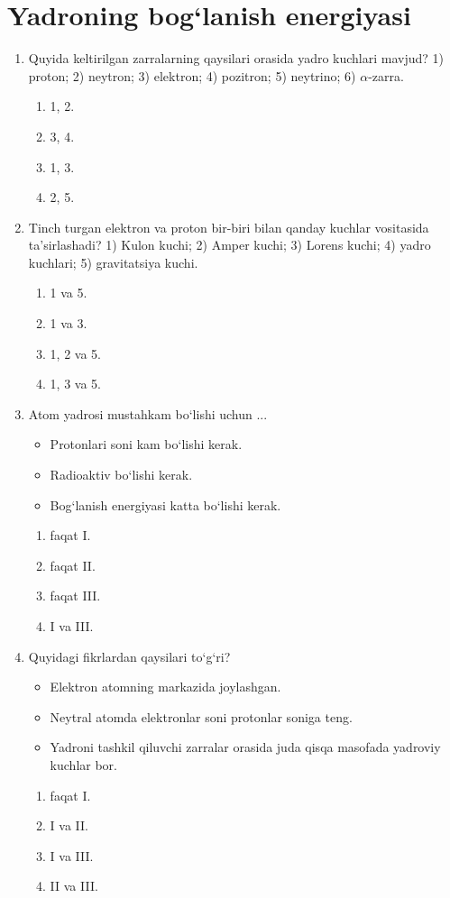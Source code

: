 \section{Yadroning bog‘lanish energiyasi}



\begin{enumerate}

\item Quyida keltirilgan zarralarning qaysilari orasida yadro kuchlari mavjud?
1) proton; 2) neytron; 3) elektron; 4) pozitron; 5) neytrino; 6) $\alpha$-zarra.
\begin{enumerate}[label=\Alph*)]
\item 1, 2.
\item 3, 4.
\item 1, 3.
\item 2, 5.
\end{enumerate}

\item Tinch turgan elektron va proton bir-biri bilan qanday kuchlar vositasida ta’sirlashadi?
1) Kulon kuchi; 2) Amper kuchi; 3) Lorens kuchi; 4) yadro kuchlari; 5) gravitatsiya kuchi.
\begin{enumerate}[label=\Alph*)]
\item 1 va 5.
\item 1 va 3.
\item 1, 2 va 5.
\item 1, 3 va 5.
\end{enumerate}

\item Atom yadrosi mustahkam bo‘lishi uchun ...
\begin{itemize}
    \item[I.] Protonlari soni kam bo‘lishi kerak.
    \item[II.] Radioaktiv bo‘lishi kerak.
    \item[III.] Bog‘lanish energiyasi katta bo‘lishi kerak.
\end{itemize}
\begin{enumerate}[label=\Alph*)]
\item faqat I.
\item faqat II.
\item faqat III.
\item I va III.
\end{enumerate}

\item Quyidagi fikrlardan qaysilari to‘g‘ri?
\begin{itemize}
    \item[I.] Elektron atomning markazida joylashgan.
    \item[II.] Neytral atomda elektronlar soni protonlar soniga teng.
    \item[III.] Yadroni tashkil qiluvchi zarralar orasida juda qisqa masofada yadroviy kuchlar bor.
\end{itemize}
\begin{enumerate}[label=\Alph*)]
\item faqat I.
\item I va II.
\item I va III.
\item II va III.
\end{enumerate}


\end{enumerate}
